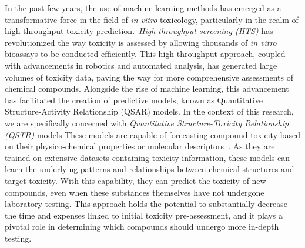 In the past few years, the use of machine learning methods has emerged as a transformative force in the field of \emph{in vitro} toxicology, particularly in the realm of high-throughput toxicity prediction.~\emph{High-throughput screening (HTS)} has revolutionized the way toxicity is assessed by allowing thousands of \emph{in vitro} bioassays to be conducted efficiently. This high-throughput approach, coupled with advancements in robotics and automated analysis, has generated large volumes of toxicity data, paving the way for more comprehensive assessments of chemical compounds.
Alongside the rise of machine learning, this advancement has facilitated the creation of predictive models, known as Quantitative Structure-Activity Relationship (QSAR) models. In the context of this research, we are specifically concerned with \emph{Quantitative Structure-Toxicity Relationship (QSTR)} models These models are capable of forecasting compound toxicity based on their physico-chemical properties or molecular descriptors~\cite{banerjee2018}. As they are trained on extensive datasets containing toxicity information, these models can learn the underlying patterns and relationships between chemical structures and target toxicity. With this capability, they can predict the toxicity of new compounds, even when these substances themselves have not undergone laboratory testing. This approach holds the potential to substantially decrease the time and expenses linked to initial toxicity pre-assessment, and it plays a pivotal role in determining which compounds should undergo more in-depth testing.


